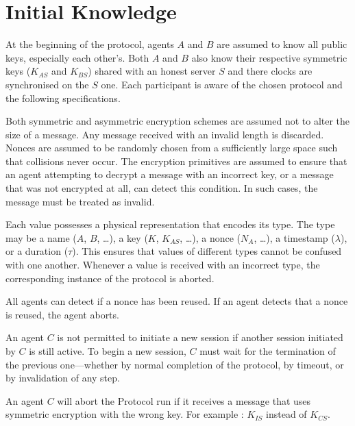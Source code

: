 \section{Initial Knowledge}
At the beginning of the protocol, agents $A$ and $B$ are assumed to know all public keys, especially each other’s.
Both $A$ and $B$ also know their respective symmetric keys ($K_{AS}$ and $K_{BS}$) shared with an honest server $S$
and there clocks are synchronised on the $S$ one. 
Each participant is aware of the chosen protocol and the following specifications.

\vspace{1cm}

Both symmetric and asymmetric encryption schemes are assumed not to alter the size of a message.
Any message received with an invalid length is discarded.
Nonces are assumed to be randomly chosen from a sufficiently large space such that collisions never occur.
The encryption primitives are assumed to ensure that an agent attempting to decrypt a message with an incorrect key,
or a message that was not encrypted at all, can detect this condition.
In such cases, the message must be treated as invalid.

\vspace{1cm}

Each value possesses a physical representation that encodes its type.
The type may be a name ($A$, $B$, …), a key ($K$, $K_{AS}$, …), a nonce ($N_{A}$, …), a timestamp ($\lambda$), or a duration ($\tau$).
This ensures that values of different types cannot be confused with one another.
Whenever a value is received with an incorrect type, the corresponding instance of the protocol is aborted.

\vspace{1cm}

All agents can detect if a nonce has been reused. If an agent detects that a nonce is reused, the agent aborts.

\vspace{1cm}

An agent $C$ is not permitted to initiate a new session if another session initiated by $C$ is still active.
To begin a new session, $C$ must wait for the termination of the previous one—whether by normal completion of the protocol, by timeout, or by invalidation of any step.

\vspace{1cm}

An agent $C$ will abort the Protocol run if it receives a message that uses symmetric encryption with the wrong key. For example : $K_{IS}$ instead of $K_{CS}$.
